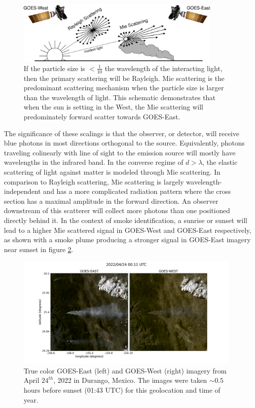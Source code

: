 \documentclass{article}
\begin{document}
\begin{figure}
    \centering
    \includegraphics[width=10cm]{figures/mei.png}
    \caption{If the particle size is \(<\frac{1}{10}\) the wavelength of the interacting light, then the primary scattering will be Rayleigh. Mie scattering is the predominant scattering mechanism when the particle size is larger than the wavelength of light. This schematic demonstrates that when the sun is setting in the West, the Mie scattering will predominately forward scatter towards GOES-East.} \label{mei}
\end{figure}

The significance of these scalings is that the observer, or detector, will receive blue photons in most directions orthogonal to the source. Equivalently, photons traveling colinearly with line of sight to the emission source will mostly have wavelengths in the infrared band. In the converse regime of \(d > \lambda\), the elastic scattering of light against matter is modeled through Mie scattering. In comparison to Rayleigh scattering, Mie scattering is largely wavelength-independent and has a more complicated radiation pattern where the cross section has a maximal amplitude in the forward direction. An observer downstream of this scatterer will collect more photons than one positioned directly behind it. In the context of smoke identification, a sunrise or sunset will lead to a higher Mie scattered signal in GOES-West and GOES-East respectively, as shown with a smoke plume producing a stronger signal in GOES-East imagery near sunset in figure \ref{16_vs_17}.

\begin{figure}
    \centering
    \includegraphics[width=11cm]{figures/G16_v_G17.png}
    \caption{True color GOES-East (left) and GOES-West (right) imagery from April \(24^{th}\), 2022 in Durango, Mexico. The images were taken \(\sim0.5\) hours before sunset (01:43 UTC) for this geolocation and time of year.}\label{16_vs_17}
\end{figure}
\end{document}
